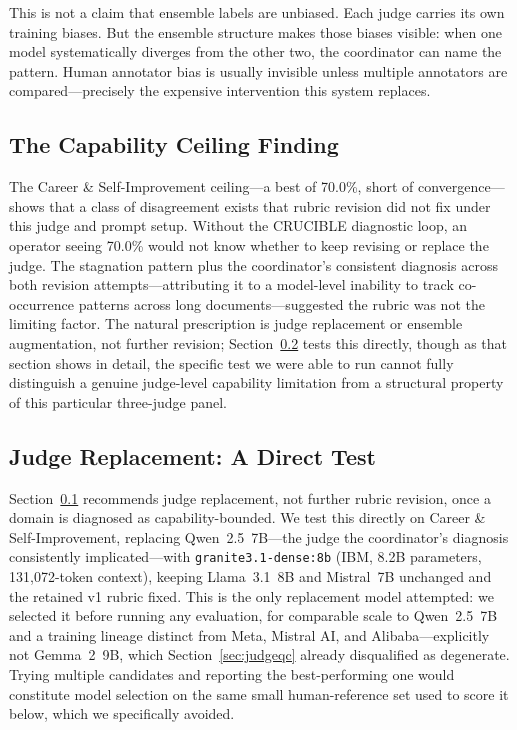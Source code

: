 \documentclass[11pt]{article}
\begin{document}
This is not a claim that ensemble labels are unbiased. Each judge carries its
own training biases. But the ensemble structure makes those biases visible:
when one model systematically diverges from the other two, the coordinator can
name the pattern. Human annotator bias is usually invisible unless multiple
annotators are compared---precisely the expensive intervention this system
replaces.

\subsection{The Capability Ceiling Finding}
\label{sec:ceiling}

The Career \& Self-Improvement ceiling---a best of 70.0\%, short of
convergence---shows that a class of disagreement exists that rubric revision did not fix under
this judge and prompt setup. Without the CRUCIBLE diagnostic loop, an
operator seeing 70.0\% would not know whether to keep revising or replace
the judge. The stagnation pattern plus the coordinator's consistent
diagnosis across both revision attempts---attributing it to a model-level
inability to track co-occurrence patterns across long documents---suggested
the rubric was not the limiting factor. The natural prescription is judge
replacement or ensemble augmentation, not further revision;
Section~\ref{sec:judgereplacement} tests this directly, though as that
section shows in detail, the specific test we were able to run cannot
fully distinguish a genuine judge-level capability limitation from a
structural property of this particular three-judge panel.

\subsection{Judge Replacement: A Direct Test}
\label{sec:judgereplacement}

Section~\ref{sec:ceiling} recommends judge replacement, not further rubric
revision, once a domain is diagnosed as capability-bounded. We test this
directly on Career \& Self-Improvement, replacing Qwen~2.5~7B---the judge
the coordinator's diagnosis consistently implicated---with
\texttt{granite3.1-dense:8b} (IBM, 8.2B parameters, 131{,}072-token
context), keeping Llama~3.1~8B and Mistral~7B unchanged and the retained
v1 rubric fixed. This is the only replacement model attempted: we selected
it before running any evaluation, for comparable scale to Qwen~2.5~7B and a
training lineage distinct from Meta, Mistral AI, and Alibaba---explicitly
not Gemma~2~9B, which Section~\ref{sec:judgeqc} already disqualified as
degenerate. Trying multiple candidates and reporting the best-performing
one would constitute model selection on the same small human-reference set
used to score it below, which we specifically avoided.
\end{document}

